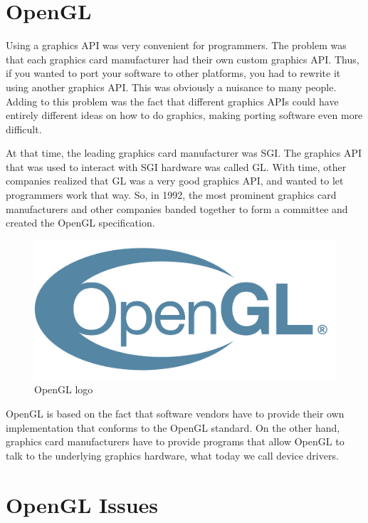 \section{OpenGL}

Using a graphics API was very convenient for programmers.
The problem was that each graphics card manufacturer had their own custom
graphics API.
Thus, if you wanted to port your software to other platforms, you had to
rewrite it using another graphics API.
This was obviously a nuisance to many people.
Adding to this problem was the fact that different graphics APIs could
have entirely different ideas on how to do graphics, making porting software
even more difficult.

At that time, the leading graphics card manufacturer was SGI.
The graphics API that was used to interact with SGI hardware was called GL.
With time, other companies realized that GL was a very good graphics API,
and wanted to let programmers work that way.
So, in 1992, the most prominent graphics card manufacturers and other companies
banded together to form a committee and created the OpenGL specification.

\begin{figure}[ht]
    \centering
    \includegraphics[scale=0.10]{images/ChVulkan/OpenGlLogo.png}
    \caption{OpenGL logo}
    \label{fig::OpenGLLogo}
\end{figure}

OpenGL is based on the fact that software vendors have to
provide their own implementation that conforms to the OpenGL standard.
On the other hand, graphics card manufacturers have to provide programs
that allow OpenGL to talk to the underlying graphics hardware, what today we
call device drivers.

\section{OpenGL Issues}

